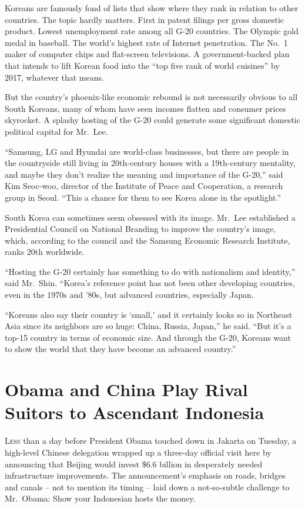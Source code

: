 ﻿\documentclass[12pt]{article}
\begin{document}
Koreans are famously fond of lists that show where they rank in relation to other countries. The
topic hardly matters. First in patent filings per gross domestic product. Lowest unemployment rate
among all G-20 countries. The Olympic gold medal in baseball. The world's highest rate of Internet
penetration. The No.~1 maker of computer chips and flat-screen televisions. A government-backed plan
that intends to lift Korean food into the ``top five rank of world cuisines'' by 2017, whatever that
means.

But the country's phoenix-like economic rebound is not necessarily obvious to all South Koreans,
many of whom have seen incomes flatten and consumer prices skyrocket. A splashy hosting of the G-20
could generate some significant domestic political capital for Mr.~Lee.

``Samsung, LG and Hyundai are world-class businesses, but there are people in the countryside still
living in 20th-century houses with a 19th-century mentality, and maybe they don't realize the
meaning and importance of the G-20,'' said Kim Seoc-woo, director of the Institute of Peace and
Cooperation, a research group in Seoul. ``This a chance for them to see Korea alone in the
spotlight.''

South Korea can sometimes seem obsessed with its image. Mr.~Lee established a Presidential Council
on National Branding to improve the country's image, which, according to the council and the Samsung
Economic Research Institute, ranks 20th worldwide.

``Hosting the G-20 certainly has something to do with nationalism and identity,'' said Mr.~Shin.
``Korea's reference point has not been other developing countries, even in the 1970s and '80s, but
advanced countries, especially Japan.

``Koreans also say their country is `small,' and it certainly looks so in Northeast Asia since its
neighbors are so huge: China, Russia, Japan,'' he said. ``But it's a top-15 country in terms of
economic size. And through the G-20, Koreans want to show the world that they have become an
advanced country.''

\section{Obama and China Play Rival Suitors to Ascendant Indonesia}

\lettrine{L}{ess} than a day before President Obama touched down in Jakarta
on Tuesday, a high-level Chinese delegation wrapped up a three-day official visit here by announcing
that Beijing would invest \$6.6 billion in desperately needed infrastructure improvements. The
announcement's emphasis on roads, bridges and canals -- not to mention its timing -- laid down a
not-so-subtle challenge to Mr.~Obama: Show your Indonesian hosts the money.
\end{document}
